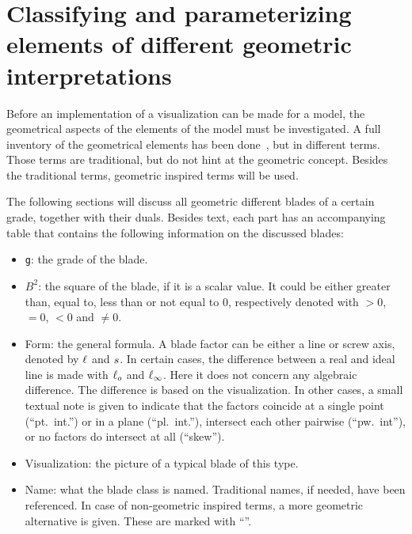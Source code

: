 \section{Classifying and parameterizing elements of different geometric interpretations}
\label{ch:research}

Before an implementation of a visualization can be made for a model, the geometrical aspects of the elements of the model must be investigated.  A full inventory of the geometrical elements has been done~\cite[Chapter 3]{Pottmann}, but in different terms.  Those terms are traditional, but do not hint at the geometric concept.  Besides the traditional terms, geometric inspired terms will be used.  

The following sections will discuss all geometric different blades of a certain grade, together with their duals.  Besides text, each part has an accompanying table that contains the following information on the discussed blades:
\begin{itemize}
  \item \texttt{g}: the grade of the blade.
  \item $B^2$: the square of the blade, if it is a scalar value.  It could be either greater than, equal to, less than or not equal to 0, respectively denoted with $> 0$, $= 0$, $< 0$ and $\not= 0$.
  \item Form: the general formula.  A blade factor can be either a line or screw axis, denoted by $\ell$ and $s$.  In certain cases, the difference between a real and ideal line is made with $\ell_o$ and $\ell_\infty$.  Here it does not concern any algebraic difference.  The difference is based on the visualization.  In other cases, a small textual note is given to indicate that the factors coincide at a single point (``pt.\ int.'') or in a plane (``pl.\ int.''), intersect each other pairwise (``pw.\ int''), or no factors do intersect at all (``skew'').
  \item Visualization: the picture of a typical blade of this type.
  \item Name: what the blade class is named.  Traditional names, if needed, have been referenced.  In case of non-geometric inspired terms, a more geometric alternative is given.  These are marked with ``\newterm''.
\end{itemize}


